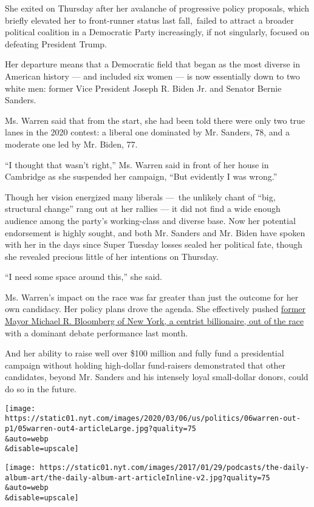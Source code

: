 She exited on Thursday after her avalanche of progressive policy
proposals, which briefly elevated her to front-runner status last
fall,~failed to attract a broader political coalition in a Democratic
Party increasingly, if not singularly, focused on defeating President
Trump.

Her departure means that a Democratic field that began as the most
diverse in American history --- and included six women --- is now
essentially down to two white men: former Vice President Joseph R. Biden
Jr. and Senator Bernie Sanders.

Ms. Warren said that from the start, she had been told there were only
two true lanes in the 2020 contest: a liberal one dominated by Mr.
Sanders, 78, and a moderate one led by Mr. Biden, 77.

``I thought that wasn't right,'' Ms. Warren said in front of her house
in Cambridge as she suspended her campaign, ``But evidently I was
wrong.''

Though her vision energized many liberals ---~the unlikely chant of
``big, structural change'' rang out at her rallies --- it did not find a
wide enough audience among the party's working-class and diverse base.
Now her potential endorsement is highly sought, and both Mr. Sanders and
Mr. Biden have spoken with her in the days since Super Tuesday losses
sealed her political fate, though she revealed precious little of her
intentions on Thursday.

``I need some space around this,'' she said.

Ms. Warren's impact on the race was far greater than just the outcome
for her own candidacy. Her policy plans drove the agenda. She
effectively pushed
\href{https://www.nytimes.com/2020/03/04/us/politics/michael-bloomberg-drops-out.html}{former
Mayor Michael R. Bloomberg of New York, a centrist billionaire, out of
the race} with a dominant debate performance last month.

And her ability to raise well over \$100 million and fully fund a
presidential campaign without holding high-dollar fund-raisers
demonstrated that other candidates, beyond Mr. Sanders and his intensely
loyal small-dollar donors, could do so in the future.

\texttt{[image: https://static01.nyt.com/images/2020/03/06/us/politics/06warren-out-p1/05warren-out4-articleLarge.jpg?quality=75\\\&auto=webp\\\&disable=upscale]}

\texttt{[image: https://static01.nyt.com/images/2017/01/29/podcasts/the-daily-album-art/the-daily-album-art-articleInline-v2.jpg?quality=75\\\&auto=webp\\\&disable=upscale]}

